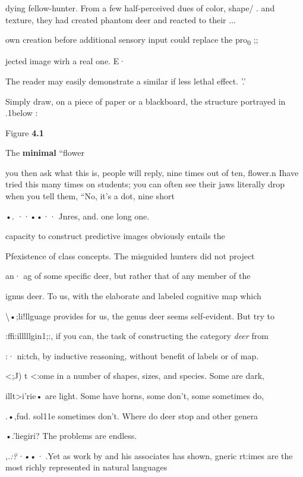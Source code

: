 dying fellow-hunter. From a few half-perceived dues of color, shape/ . and texture, they had created phantom deer and reacted to their ...

own creation before additional sensory input could replace the pro\textsubscript{0}\textsubscript{ };;

jected image wirh a real one. E·

The reader may easily demonstrate a similar if less lethal effect. '.'

Simply draw, on a piece of paper or a blackboard, the structure por\-trayed in .1below :

  


 

Figure \textbf{4.1}

The \textbf{minimal} ``flower{\textquotedbl}


you then ask what this is, people will reply, nine times out of ten, flower.n Ihave tried this many times on students; you can often see their jaws literally drop when you tell them, ``No, it's a dot, nine short

•. ··••·· Jnres, and. one long one.{\textquotedbl}

capacity to construct predictive images obviously entails the

Pfexistence of class concepts. The misguided hunters did not project

an· ag of some specific deer, but rather that of any member of the

ignus deer. To us, with the elaborate and labeled cognitive map which

{\textbackslash}•;li!llguage provides for us, the genus deer seems self-evident. But try to

:ffi:illlllgin1;:, if you can, the task of constructing the category \textit{deer} from

:· ni:tch, by inductive reasoning, without benefit of labels or of map.

{\textless};J) t {\textless}:ome in a number of shapes, sizes, and species. Some are dark,

illt{\textgreater}i'rie• are light. Some have horns, some don't, some sometimes do,

.•,fud. sol11e sometimes don't. Where do deer stop and other genera

•.'liegiri? The problems are endless.

,\textit{.}\textit{:}\textit{?}\textit{·•}•\textit{· }.Yet as work by \citet{Berlin1972} and his associates has shown, gneric rt:imes are the most richly represented in natural languages\-

